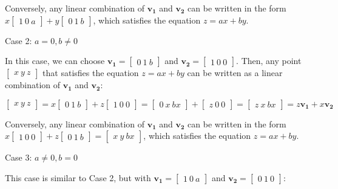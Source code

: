 \documentclass[
  letterpaper,
  DIV=11,
  numbers=noendperiod]{scrartcl}
\begin{document}
Conversely, any linear combination of \(\mathbf{v_1}\) and
\(\mathbf{v_2}\) can be written in the form
\(x\begin{bmatrix} 1 \ 0 \ a \end{bmatrix} + y\begin{bmatrix} 0 \ 1 \ b \end{bmatrix}\),
which satisfies the equation \(z = ax + by\).

Case 2: \(a = 0, b \neq 0\)

In this case, we can choose
\(\mathbf{v_1} = \begin{bmatrix} 0 \ 1 \ b \end{bmatrix}\) and
\(\mathbf{v_2} = \begin{bmatrix} 1 \ 0 \ 0 \end{bmatrix}\). Then, any
point \(\begin{bmatrix} x \ y \ z \end{bmatrix}\) that satisfies the
equation \(z = ax + by\) can be written as a linear combination of
\(\mathbf{v_1}\) and \(\mathbf{v_2}\):

\(\begin{bmatrix} x \ y \ z \end{bmatrix} = x\begin{bmatrix} 0 \ 1 \ b \end{bmatrix} + z\begin{bmatrix} 1 \ 0 \ 0 \end{bmatrix} = \begin{bmatrix} 0 \ x \ bx \end{bmatrix} + \begin{bmatrix} z \ 0 \ 0 \end{bmatrix} = \begin{bmatrix} z \ x \ bx \end{bmatrix} = z\mathbf{v_1} + x\mathbf{v_2}\)

Conversely, any linear combination of \(\mathbf{v_1}\) and
\(\mathbf{v_2}\) can be written in the form
\(x\begin{bmatrix} 1 \ 0 \ 0 \end{bmatrix} + z\begin{bmatrix} 0 \ 1 \ b \end{bmatrix} = \begin{bmatrix} x \ y \ bx \end{bmatrix}\),
which satisfies the equation \(z = ax + by\).

Case 3: \(a \neq 0, b = 0\)

This case is similar to Case 2, but with
\(\mathbf{v_1} = \begin{bmatrix} 1 \ 0 \ a \end{bmatrix}\) and
\(\mathbf{v_2} = \begin{bmatrix} 0 \ 1 \ 0 \end{bmatrix}\):
\end{document}
